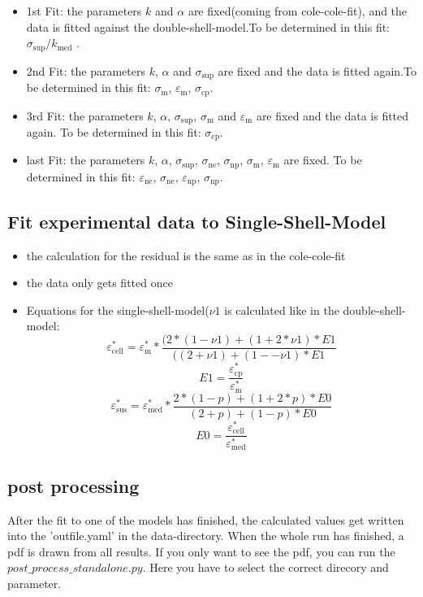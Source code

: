 \documentclass[10pt,a4paper]{article}
\renewcommand{\*}{\cdot}
\begin{document}
\begin{itemize}
\item 1st Fit: the parameters $k$ and $\alpha$ are fixed(coming from cole-cole-fit), and the data is fitted against the double-shell-model.To be determined in this fit: $\sigma_\mathrm{sup} / k_\mathrm{med}$ . 
\item 2nd Fit: the parameters $k$, $\alpha$ and $\sigma_\mathrm{sup}$ are fixed and the data is fitted again.To be determined in this fit: $\sigma_\mathrm{m}$, $\varepsilon_\mathrm{m}$, $\sigma_\mathrm{cp}$. 
\item 3rd Fit: the parameters $k$, $\alpha$, $\sigma_\mathrm{sup}$, $\sigma_\mathrm{m}$ and $\varepsilon_\mathrm{m}$ are fixed and the data is fitted again. To be determined in this fit: $\sigma_\mathrm{cp}$.

\item last Fit: the parameters $k$, $\alpha$, $\sigma_\mathrm{sup}$, $\sigma_\mathrm{ne}$, $\sigma_\mathrm{np}$, $\sigma_\mathrm{m}$, $\varepsilon_\mathrm{m}$ are fixed. To be determined in this fit: $\varepsilon_\mathrm{ne}$, $\sigma_\mathrm{ne}$, $\varepsilon_\mathrm{np}$, $\sigma_\mathrm{np}$.
\end{itemize}
\subsection{Fit experimental data to Single-Shell-Model}
\begin{itemize}
\item the calculation for the residual is the same as in the cole-cole-fit
\item the data only gets fitted once
\item Equations for the single-shell-model($\nu1$ is calculated like in the double-shell-model: 
\begin{equation}
\varepsilon_\mathrm{cell}^* = \varepsilon_\mathrm{m}^* * \frac{(2 * (1 - \nu1) + (1 + 2 * \nu1) * E1}{((2 + \nu1) + (1 - -\nu1) * E1}
\end{equation}
\begin{equation}
E1 = \frac{\varepsilon_\mathrm{cp}^*}{\varepsilon_\mathrm{m}^*}
\end{equation}
\begin{equation}
\varepsilon_\mathrm{sus}^* = \varepsilon_\mathrm{med}^* * \frac{2 * (1- p) + (1 + 2 * p) * E0}{(2 + p) + (1- p) * E0}
\end{equation}
\begin{equation}
E0  = \frac{\varepsilon_\mathrm{cell}^*}{\varepsilon_\mathrm{med}^*}
\end{equation}
\end{itemize}
\subsection{post processing}
After the fit to one of the models has finished, the calculated values get written into the 'outfile.yaml' in the data-directory. When the whole run has finished, a pdf is drawn from all results. If you only want to see the pdf, you can run the $post\_process\_standalone.py$. Here you have to select the correct direcory and parameter. 
\end{document}
